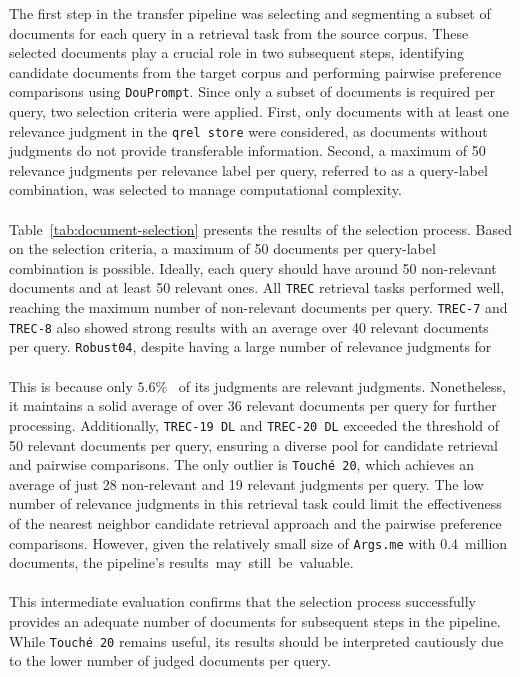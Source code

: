 The first step in the transfer pipeline was selecting and segmenting a subset of documents for each query in a retrieval task from the source corpus. These selected documents play a crucial role in two subsequent steps, identifying candidate documents from the target corpus and performing pairwise preference comparisons using \texttt{DouPrompt}. Since only a subset of documents is required per query, two selection criteria were applied. First, only documents with at least one relevance judgment in the \texttt{qrel store} were considered, as documents without judgments do not provide transferable information. Second, a maximum of 50 relevance judgments per relevance label per query, referred to as a query-label combination, was selected to manage computational complexity.
\\\\
Table~\ref{tab:document-selection} presents the results of the selection process. Based on the selection criteria, a maximum of 50 documents per query-label combination is possible. Ideally, each query should have around 50 non-relevant documents and at least 50 relevant ones. All \texttt{TREC} retrieval tasks performed well, reaching the maximum number of non-relevant documents per query. \texttt{TREC-7} and \texttt{TREC-8} also showed strong results with an average over 40 relevant documents per query. \texttt{Robust04}, despite having a large number of relevance judgments for 
\\\\
This is because only $5.6\%$~\cite{voorhees:1996} of its judgments are relevant judgments. Nonetheless, it maintains a solid average of over 36 relevant documents per query for further processing. Additionally, \texttt{TREC-19 DL} and \texttt{TREC-20 DL} exceeded the threshold of 50 relevant documents per query, ensuring a diverse pool for candidate retrieval and pairwise comparisons. The only outlier is \texttt{Touché 20}, which achieves an average of just 28 non-relevant and 19 relevant judgments per query. The low number of relevance judgments in this retrieval task could limit the effectiveness of the nearest neighbor candidate retrieval approach and the pairwise preference comparisons. However, given the relatively small size of \texttt{Args.me} with 0.4~million documents, the pipeline's \mbox{results may still be valuable}.
\\\\
This intermediate evaluation confirms that the selection process successfully provides an adequate number of documents for subsequent steps in the pipeline. While \texttt{Touché 20} remains useful, its results should be interpreted cautiously due to the lower number of judged documents per query.

